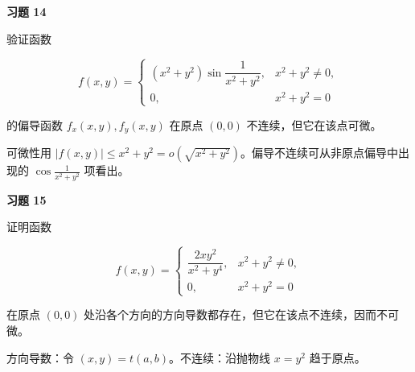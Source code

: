 \begin{exercisebox}
\textbf{习题 14}

验证函数

\[
      f(x,y)=
      \begin{cases}
      (x^2+y^2)\sin\dfrac1{x^2+y^2}, & x^2+y^2\ne0,\\
      0, & x^2+y^2=0
      \end{cases}
      \]

的偏导函数 \(f_x(x,y),f_y(x,y)\) 在原点 \((0,0)\) 不连续，但它在该点可微。

\begin{hintbox}
可微性用 \(|f(x,y)|\le x^2+y^2=o(\sqrt{x^2+y^2})\)。偏导不连续可从非原点偏导中出现的 \(\cos\frac1{x^2+y^2}\) 项看出。
\end{hintbox}
\end{exercisebox}

\begin{exercisebox}
\textbf{习题 15}

证明函数

\[
      f(x,y)=
      \begin{cases}
      \dfrac{2xy^2}{x^2+y^4}, & x^2+y^2\ne0,\\
      0, & x^2+y^2=0
      \end{cases}
      \]

在原点 \((0,0)\) 处沿各个方向的方向导数都存在，但它在该点不连续，因而不可微。

\begin{hintbox}
方向导数：令 \((x,y)=t(a,b)\)。不连续：沿抛物线 \(x=y^2\) 趋于原点。
\end{hintbox}
\end{exercisebox}

